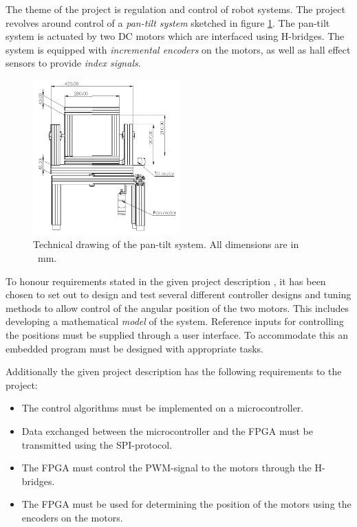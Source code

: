 \documentclass[../../main.tex]{subfiles}
\begin{document}
The theme of the project is regulation and control of robot systems. The project revolves around control of a \textit{pan-tilt system} sketched in figure \ref{fig:Pan_Tilt_Drawing}. 
The pan-tilt system is actuated by two DC motors which are interfaced using H-bridges. The system is equipped with \textit{incremental encoders} on the motors, as well as hall effect sensors to provide \textit{index signals}.

\begin{figure}[H]
    \centering
    \includegraphics[width=0.5\textwidth]{Sections/Miscellaneous/Images/PhysicalMotorModel.png}
    \caption{Technical drawing of the pan-tilt system. All dimensions are in \SI{}{\milli \meter}.}
    \label{fig:Pan_Tilt_Drawing}
\end{figure}

To honour requirements stated in the given project description \cite{christoffersloth}, it has been chosen to set out to design and test several different controller designs and tuning methods to allow control of the angular position of the two motors. This includes developing a mathematical \textit{model} of the system. Reference inputs for controlling the positions must be supplied through a user interface. To accommodate this an embedded program must be designed with appropriate tasks.

Additionally the given project description has the following requirements to the project:

\begin{itemize}
    \item The control algorithms must be implemented on a microcontroller.
    \item Data exchanged between the microcontroller and the FPGA must be transmitted using the SPI-protocol. 
    \item The FPGA must control the PWM-signal to the motors through the H-bridges.
    \item The FPGA must be used for determining the position of the motors using the encoders on the motors.
\end{itemize}
\end{document}
